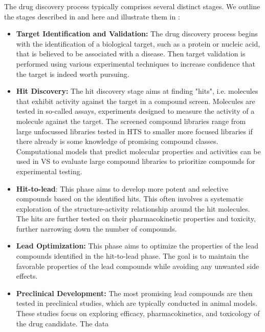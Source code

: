 The drug discovery process typically comprises several distinct stages. We outline the stages
described in \citet{hughesPrinciplesEarlyDrug2011} and \citep{umscheidKeyConceptsClinical2011} here and illustrate them in :
\begin{itemize}
    \item \textbf{Target Identification and Validation:} The drug discovery process begins with
          the identification of a biological target, such as a protein or nucleic acid, that is
          believed to be associated with a disease. Then target validation is performed using
          various experimental techniques to increase confidence that the target is indeed worth
          pursuing.
    \item \textbf{Hit Discovery:} The hit discovery stage aims at finding "hits", i.e. molecules
          that exhibit activity against the target in a compound screen. Molecules are tested in
          so-called assays, experiments designed to measure the activity of a molecule against the
          target. The screened compound libraries range from large unfocussed libraries tested in
          \ac{HTS} to smaller more focused libraries if there already is some knowledge of promising
          compound classes. Computational models that predict molecular properties and activities
          can be used in \ac{VS}
          \citep{waltersVirtualScreeningOverview1998,shoichetVirtualScreeningChemical2004a} to
          evaluate large compound libraries to prioritize compounds for experimental testing.
    \item \textbf{Hit-to-lead}: This phase aims to develop more potent and selective compounds
          based on the identified hits. This often involves a systematic exploration of the
          structure-activity relationship around the hit molecules.  The hits are further tested on
          their pharmacokinetic properties and toxicity, further narrowing down the number of
          compounds.
    \item \textbf{Lead Optimization:} This phase aims to optimize the properties of the
          lead compounds identified in the hit-to-lead phase. The goal is to maintain the favorable
          properties of the lead compounds while avoiding any unwanted side effects.
    \item \textbf{Preclinical Development:} The most promising lead compounds are then tested in
          preclinical studies, which are typically conducted in animal models. These studies focus
          on exploring efficacy, pharmacokinetics, and toxicology of the drug candidate. The data

\end{itemize}
